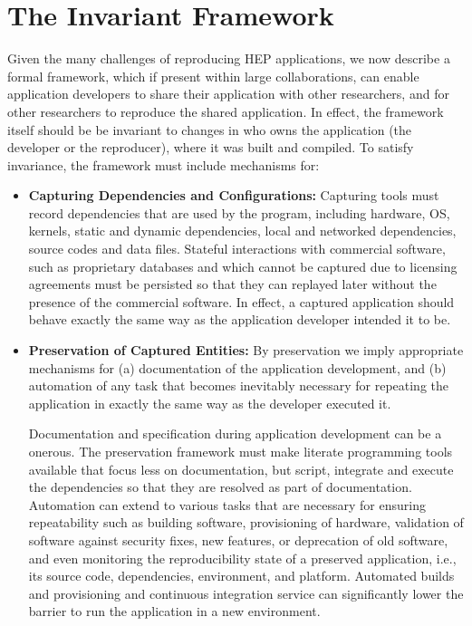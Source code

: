 \section{The Invariant Framework}

Given the many challenges of reproducing HEP applications, we now describe a formal framework, which if present within large collaborations, can enable application developers to share their 
application with other researchers, and for other researchers to reproduce the shared application. In effect, the framework itself should be 
be invariant to changes in who owns the application (the developer or the reproducer), where it was built and compiled. To satisfy invariance, the framework must include mechanisms for:

\begin{itemize}

\item {\bf Capturing Dependencies and Configurations:} Capturing tools must record dependencies that are used by the program, including hardware, OS, kernels, static and dynamic dependencies, local and networked dependencies, source codes and data files. Stateful interactions with commercial software, such as proprietary databases and which cannot be captured due to licensing agreements must be persisted so that they can replayed later without the presence of the commercial software.  In effect, a captured application should behave exactly the same way as the application developer intended it to be. 

\item{\bf Preservation of Captured Entities:} By preservation we imply appropriate mechanisms for (a) documentation of the application development, and (b) automation of any task that becomes inevitably 
necessary for repeating the application in exactly the same way as the developer executed it. 
 
Documentation and specification during application development can be a onerous. The preservation framework must make literate programming tools available that 
focus less on documentation, but script, integrate and execute the dependencies so that they are resolved as part of documentation. 
Automation can extend to various tasks that are necessary for ensuring repeatability such as building software, provisioning of hardware, 
validation of software against security fixes, new features, or deprecation of old software, and even monitoring the reproducibility state of a preserved application, i.e., its source code, dependencies, environment, and platform.
Automated builds and provisioning and continuous integration service can significantly lower the barrier to run the application in a new environment. 


\end{itemize}
